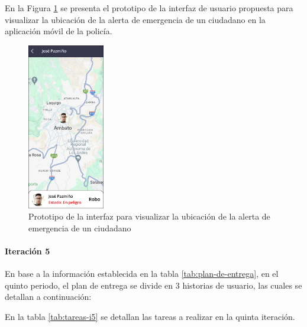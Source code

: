 En la Figura \ref{fig:prototipo-ubicacion-alerta-policia} se presenta el prototipo de la interfaz de usuario propuesta para
visualizar la ubicación de la alerta de emergencia de un ciudadano en la aplicación móvil de la policía.

\begin{figure}[H]
      \centering
      \includegraphics[width=0.3\textwidth]{chapters/III-resultados-y-discusion/resources/images/prototipo-ubicacion-alerta-policia.png}
      \caption{Prototipo de la interfaz para visualizar la ubicación de la alerta de emergencia de un ciudadano}
      \label{fig:prototipo-ubicacion-alerta-policia}
\end{figure}

\paragraph{Iteración 5}

En base a la información establecida en la tabla \ref{tab:plan-de-entrega}, en el quinto periodo, el plan de
entrega se divide en 3 historias de usuario, las cuales se detallan a continuación:



En la tabla \ref{tab:tareas-i5} se detallan las tareas a realizar en la quinta iteración.




